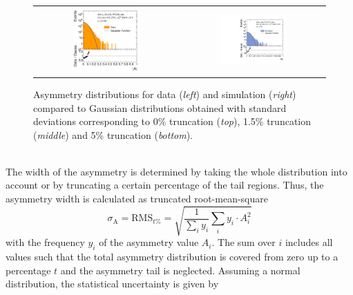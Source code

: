\begin{figure}[!htp]
\begin{tabular}{cc}
                \includegraphics[width=0.49\textwidth]{figures/AsymmHistosDataWithRatio_Eta0_pt5_alpha2_final_nominal_95Truncation_v4.pdf} &
                \includegraphics[width=0.49\textwidth]{figures/AsymmHistosSimWithRatio_Eta0_pt5_alpha2_final_nominal_95Truncation_v4b.pdf} \\
  \end{tabular}
  \caption{Asymmetry distributions for data (\textit{left}) and simulation (\textit{right}) compared to Gaussian distributions obtained with standard deviations corresponding to 0\% truncation (\textit{top}), 1.5\% truncation (\textit{middle}) and 5\% truncation (\textit{bottom}).}
  \label{fig:asymm_width}
\end{figure}
\\
The width of the asymmetry is determined by taking the whole distribution into account or by truncating a certain percentage of the tail regions. Thus, the asymmetry width is calculated as truncated root-mean-square
\begin{equation}
 \sigma_\mathrm{A} = \mathrm{RMS}_{t\%} = \sqrt{\frac{1}{\sum_{i} y_i} \sum_{i} y_i \cdot A_i^2}  
 \label{eq:truncated_rms}
\end{equation} 
with the frequency $y_i$ of the asymmetry value $A_i$. The sum over $i$ includes all values such that the total asymmetry distribution is covered from zero up to a percentage $t$ and the asymmetry tail is neglected. Assuming a normal distribution, the statistical uncertainty is given by
